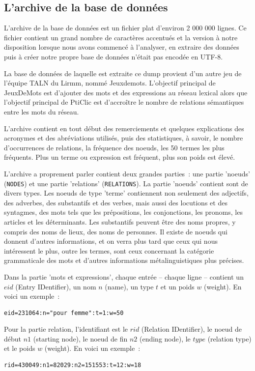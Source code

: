 \documentclass[a4paper,11pt,french]{article}
\begin{document}
\subsection{L'archive de la base de données}

L'archive de la base de données est un fichier plat d'environ 2 000 000 lignes. Ce fichier contient un grand nombre de caractères accentués et
la version à notre disposition lorsque nous avons commencé à l'analyser, en extraire des données puis à créer notre propre base de données
n'était pas encodée en UTF-8.

La base de données de laquelle est extraite ce dump provient d'un autre jeu de l'équipe TALN du Lirmm, nommé Jeuxdemots. L'objectif principal de JeuxDeMots est d'ajouter des mots et des expressions au réseau lexical alors que l'objectif principal de PtiClic est d'accroître le nombre de relations sémantiques entre les mots du réseau.

L'archive contient en tout début des remerciements et quelques explications des acronymes et des abréviations utilisés, puis des statistiques, à savoir, le nombre d'occurrences de relations, la fréquence des noeuds, les 50 termes les plus fréquents. Plus un terme ou expression est fréquent, plus son poids est élevé. 

L'archive a proprement parler contient deux grandes parties~: une partie 'noeuds' (\verb!NODES!) et une partie 'relations' (\verb!RELATIONS!). La partie 'noeuds'  contient sont de divers types. Les noeuds de type 'terme' contiennent non seulement des adjectifs, des adverbes, des substantifs et des verbes, mais aussi des locutions et des syntagmes, des mots tels que les prépositions, les conjonctions, les pronoms, les articles et les déterminants. Les substantifs peuvent être des noms propres, y compris des noms de lieux, des noms de personnes. Il existe de noeuds qui donnent d'autres informations, et on verra plus tard que ceux qui nous intéressent le plus, outre les termes, sont ceux concernant la catégorie grammaticale des mots et d'autres informations métalinguistiques plus précises.

Dans la partie 'mots et expressions', chaque entrée -- chaque ligne -- contient un $eid$ (Entry IDentifier), un nom $n$ (name), un type $t$ et un poids $w$ (weight). En voici un exemple~:
\indent%
\begin{verbatim}
eid=231064:n="pour femme":t=1:w=50
\end{verbatim}

Pour la partie relation, l'identifiant est le $rid$ (Relation IDentifier), le noeud de début $n1$ (starting node), le noeud de fin $n2$ (ending node), le $type$ (relation type) et le poids $w$ (weight). En voici un exemple~:
\begin{verbatim}
rid=430049:n1=82029:n2=151553:t=12:w=18
\end{verbatim}
\end{document}
